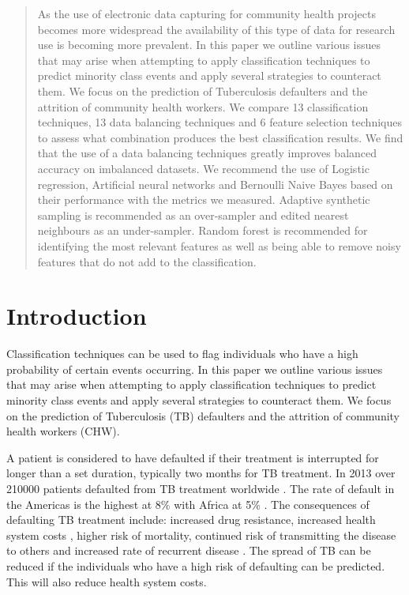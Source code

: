 \documentclass{sig-alternate-05-2015}
\begin{document}
	\maketitle
	\begin{abstract}
		As the use of electronic data capturing for community health projects becomes more widespread the availability of this type of data for research use is becoming more prevalent. In this paper we outline various issues that may arise when attempting to apply classification techniques to predict minority class events and apply several strategies to counteract them. We focus on the prediction of Tuberculosis defaulters and the attrition of community health workers. We compare 13 classification techniques, 13 data balancing techniques and 6 feature selection techniques to assess what combination produces the best classification results. We find that the use of a data balancing techniques greatly improves balanced accuracy on imbalanced datasets. We recommend the use of Logistic regression, Artificial neural networks and Bernoulli Naive Bayes based on their performance with the metrics we measured. Adaptive synthetic sampling is recommended as an over-sampler and edited nearest neighbours as an under-sampler. Random forest is recommended for identifying the most relevant features as well as being able to remove noisy features that do not add to the classification.
	\end{abstract}
	
	\printccsdesc
	
	
	
	\section{Introduction}
	Classification techniques can be used to flag individuals who have a high probability of certain events occurring. In this paper we outline various issues that may arise when attempting to apply classification techniques to predict minority class events and apply several strategies to counteract them. We focus on the prediction of Tuberculosis (TB) defaulters and the attrition of community health workers (CHW).
		
	A patient is considered to have defaulted if their treatment is interrupted for longer than a set duration, typically two months for TB treatment. In 2013 over 210\hspace*{1mm}000 patients defaulted from TB treatment worldwide \cite{world2015TB}. The rate of default in the Americas is the highest at 8\% with Africa at 5\% \cite{world2015TB}. The consequences of defaulting TB treatment include: increased drug resistance, increased health system costs \cite{Lackey:10356751520150601, muture:6660173120110101}, higher risk of mortality, continued risk of transmitting the disease to others \cite{Lackey:10356751520150601} and increased rate of recurrent disease \cite{Jha:10.1371/journal.pone.0008873}. The spread of TB can be reduced if the individuals who have a high risk of defaulting can be predicted. This will also reduce health system costs.
	
\end{document}
